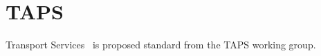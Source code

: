 \section{TAPS}\label{sec:taps}
Transport Services~\citep{pauly_architecturetransportservices_2019} is proposed standard from the TAPS working group.


